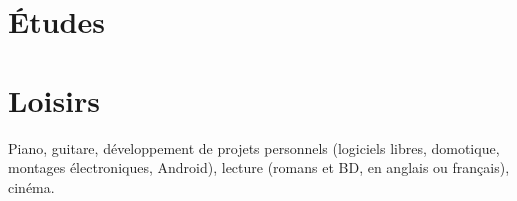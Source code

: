\documentclass[a4paper]{twentysecondcv} %
\begin{document}

\section{Études}

\begin{twenty} %
\end{twenty}


\section{Loisirs}


Piano, guitare, développement de projets personnels (logiciels libres, domotique, montages électroniques, Android), lecture (romans et BD, en anglais ou français), cinéma.





\end{document}
